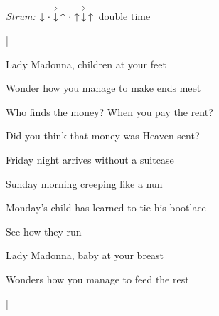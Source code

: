\begin{song}


\begin{headerbox}
\RaiseBoxWithAccents
{} \quad
\textit{Strum:} $\Down\Miss\AccentDown\Up\Miss\Up\AccentDown\Up$ double time
\end{headerbox}

\begin{hchordbox}
\end{hchordbox}

\bigskip

\Large

\Intro {}    |      \par

\bigskip

Lady Madonna, children at your feet \par
{}Wonder how you manage to make ends meet \par
{}Who finds the money? When you pay the rent? \par
{}Did you think that money was Heaven sent? \par

\bigskip

Friday night arrives without a suitcase \par
{}Sunday morning creeping like a nun \par
{}Monday's child has learned to tie his bootlace \par
{}See how they run \par

\bigskip

Lady Madonna, baby at your breast \par
{}Wonders how you manage to feed the rest \par

\bigskip

    |      \par


\end{song}
